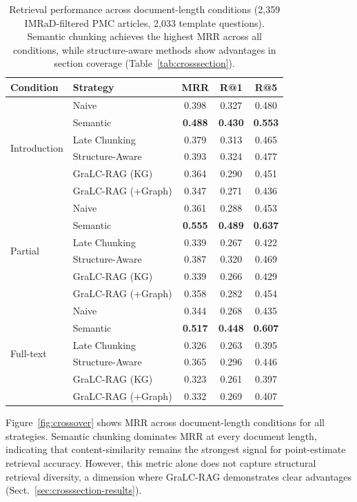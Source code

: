 \documentclass[sn-basic]{sn-jnl}
\newcommand{\gralcrag}{GraLC-RAG}
\begin{document}
\begin{table}[ht]
\centering
\caption{Retrieval performance across document-length conditions (2{,}359 IMRaD-filtered PMC articles, 2{,}033 template questions). Semantic chunking achieves the highest MRR across all conditions, while structure-aware methods show advantages in section coverage (Table~\ref{tab:crosssection}).}
\label{tab:fulltext}
\small
\begin{tabular}{@{}llccc@{}}
\toprule
\textbf{Condition} & \textbf{Strategy} & \textbf{MRR} & \textbf{R@1} & \textbf{R@5} \\
\midrule
\multirow{6}{*}{Introduction}
  & Naive              & 0.398 & 0.327 & 0.480 \\
  & Semantic           & \textbf{0.488} & \textbf{0.430} & \textbf{0.553} \\
  & Late Chunking      & 0.379 & 0.313 & 0.465 \\
  & Structure-Aware    & 0.393 & 0.324 & 0.477 \\
  & \gralcrag{} (KG)   & 0.364 & 0.290 & 0.451 \\
  & \gralcrag{} (+Graph) & 0.347 & 0.271 & 0.436 \\
\midrule
\multirow{6}{*}{Partial}
  & Naive              & 0.361 & 0.288 & 0.453 \\
  & Semantic           & \textbf{0.555} & \textbf{0.489} & \textbf{0.637} \\
  & Late Chunking      & 0.339 & 0.267 & 0.422 \\
  & Structure-Aware    & 0.387 & 0.320 & 0.469 \\
  & \gralcrag{} (KG)   & 0.339 & 0.266 & 0.429 \\
  & \gralcrag{} (+Graph) & 0.358 & 0.282 & 0.454 \\
\midrule
\multirow{6}{*}{Full-text}
  & Naive              & 0.344 & 0.268 & 0.435 \\
  & Semantic           & \textbf{0.517} & \textbf{0.448} & \textbf{0.607} \\
  & Late Chunking      & 0.326 & 0.263 & 0.395 \\
  & Structure-Aware    & 0.365 & 0.296 & 0.446 \\
  & \gralcrag{} (KG)   & 0.323 & 0.261 & 0.397 \\
  & \gralcrag{} (+Graph) & 0.332 & 0.269 & 0.407 \\
\bottomrule
\end{tabular}
\end{table}

Figure~\ref{fig:crossover} shows MRR across document-length conditions for all strategies. Semantic chunking dominates MRR at every document length, indicating that content-similarity remains the strongest signal for point-estimate retrieval accuracy. However, this metric alone does not capture structural retrieval diversity, a dimension where \gralcrag{} demonstrates clear advantages (Sect.~\ref{sec:crosssection-results}).
\end{document}
